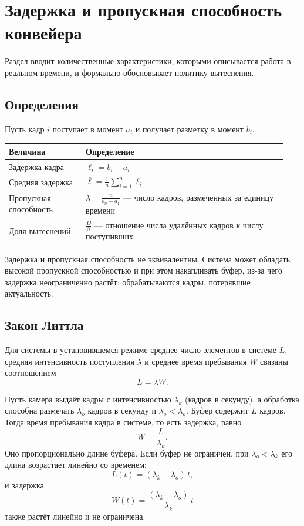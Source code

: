 \documentclass[11pt,a4paper]{article}
\theoremstyle{definition}
\theoremstyle{remark}
\begin{document}
\section{Задержка и пропускная способность конвейера}
\label{sec:latency-ref}
\label{sec:latency}

Раздел вводит количественные характеристики, которыми описывается работа в
реальном времени, и формально обосновывает политику вытеснения.

\subsection{Определения}

Пусть кадр $i$ поступает в момент $a_i$ и получает разметку в момент
$b_i$.

\begin{center}
\begin{tabular}{p{0.26\linewidth}p{0.68\linewidth}}
\toprule
Величина & Определение \\
\midrule
Задержка кадра & $\ell_i = b_i - a_i$ \\
Средняя задержка & $\bar{\ell} = \frac{1}{n}\sum_{i=1}^{n} \ell_i$ \\
Пропускная способность & $\lambda = \frac{n}{b_n - a_1}$ --- число кадров,
размеченных за единицу времени \\
Доля вытеснений & $\frac{D}{N}$ --- отношение числа удалённых кадров к числу
поступивших \\
\bottomrule
\end{tabular}
\end{center}

Задержка и пропускная способность не эквивалентны. Система может обладать
высокой пропускной способностью и при этом накапливать буфер, из-за чего
задержка неограниченно растёт: обрабатываются кадры, потерявшие актуальность.

\subsection{Закон Литтла}

Для системы в установившемся режиме среднее число элементов в системе $L$,
средняя интенсивность поступления $\lambda$ и среднее время пребывания $W$
связаны соотношением
\[
  L = \lambda W .
\]

Пусть камера выдаёт кадры с интенсивностью $\lambda_k$ (кадров в секунду), а
обработка способна размечать $\lambda_o$ кадров в секунду и
$\lambda_o < \lambda_k$. Буфер содержит $L$ кадров. Тогда время пребывания
кадра в системе, то есть задержка, равно
\[
  W = \frac{L}{\lambda_k} .
\]
Оно пропорционально длине буфера. Если буфер не ограничен, при
$\lambda_o < \lambda_k$ его длина возрастает линейно со временем:
\[
  L(t) = (\lambda_k - \lambda_o)\, t ,
\]
и задержка
\[
  W(t) = \frac{(\lambda_k - \lambda_o)}{\lambda_k}\, t
\]
также растёт линейно и не ограничена.
\end{document}
